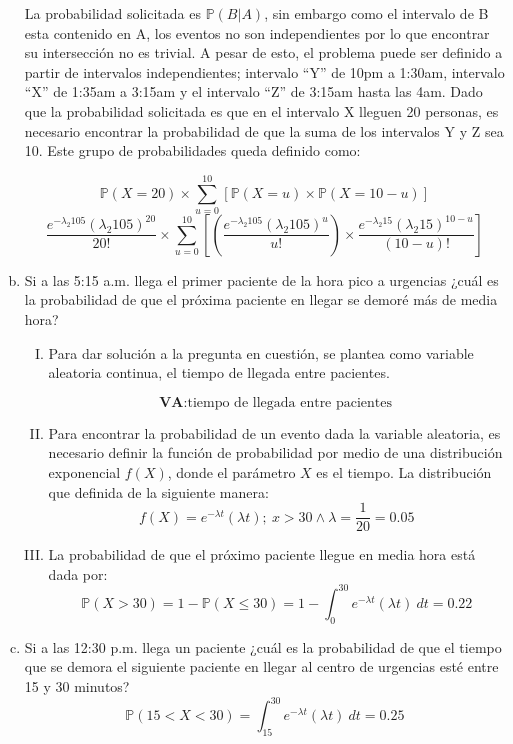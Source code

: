 \documentclass[11pt, spanish]{article}
\begin{document}
\begin{enumerate}[(a)]
La probabilidad solicitada es $\mathbb{P}(B|A)$, sin embargo como el intervalo de B esta
contenido en A, los eventos no son independientes por lo que encontrar su
intersección no es trivial. A pesar de esto, el problema puede ser definido a partir
de intervalos independientes; intervalo “Y” de 10pm a 1:30am, intervalo “X” de
1:35am a 3:15am y el intervalo “Z” de 3:15am hasta las 4am. Dado que la
probabilidad solicitada es que en el intervalo X lleguen 20 personas, es necesario
encontrar la probabilidad de que la suma de los intervalos Y y Z sea 10. Este grupo
de probabilidades queda definido como:

$$\mathbb{P}(X = 20) \times  \sum_{u = 0}^{10} \left[  \mathbb{P}(X = u) \times \mathbb{P}(X = 10 - u)\right] $$
$$\frac{e^{-\lambda_{2} 105}(\lambda_{2} 105)^{20}}{20!} \times \sum_{u = 0}^{10} \left[ \left( \frac{e^{-\lambda_{2} 105}(\lambda_{2} 105)^{u}}{u!}\right) \times \frac{e^{-\lambda_{2} 15}(\lambda_{2} 15)^{10-u}}{(10-u)!} \right]$$

\item Si a las 5:15 a.m. llega el primer paciente de la hora pico a urgencias ¿cuál es la
probabilidad de que el próxima paciente en llegar se demoré más de media hora?\\

\begin{enumerate}[(I)]

\item Para dar solución a la pregunta en cuestión, se plantea como variable aleatoria
continua, el tiempo de llegada entre pacientes.

$$\textbf{VA}: \mbox{tiempo de llegada entre pacientes}$$

\item Para encontrar la probabilidad de un evento dada la variable aleatoria, es
necesario definir la función de probabilidad por medio de una distribución
exponencial $f(X)$, donde el parámetro $X$ es el tiempo. La distribución que
definida de la siguiente manera:
$$f(X) = e^{-\lambda t}(\lambda t);\ x > 30 \wedge \lambda = \frac{1}{20} = 0.05$$

\item La probabilidad de que el próximo paciente llegue en media hora está dada
por:
$$\mathbb{P}(X > 30) = 1 - \mathbb{P}(X \leq 30) = 1 - \int_{0}^{30} e^{-\lambda t}(\lambda t)\ dt = 0.22$$

\end{enumerate}

\item Si a las 12:30 p.m. llega un paciente ¿cuál es la probabilidad de que el tiempo que
se demora el siguiente paciente en llegar al centro de urgencias esté entre 15 y 30 minutos?
$$\mathbb{P}(15 < X < 30) = \int_{15}^{30} e^{-\lambda t}(\lambda t)\ dt = 0.25$$


\end{enumerate}
\end{document}
